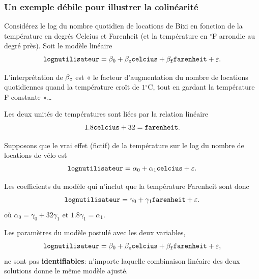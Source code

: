 \documentclass[xcolor={dvipsnames}]{beamer}
\begin{document}
\begin{frame}
\frametitle{Un exemple débile pour illustrer la colinéarité}
\bi
\item Considérez le log du nombre quotidien de locations de Bixi  en fonction de la température en degrés Celcius et Farenheit (et la température en ${}^{\circ}$F arrondie au degré près). Soit le modèle linéaire 
\begin{align*}
 \texttt{lognutilisateur} = \beta_0 + \beta_{\texttt{c}} \texttt{celcius} + \beta_{\texttt{f}} \texttt{farenheit} + \varepsilon.
\end{align*}
\item L'interprétation de $\beta_{\texttt{c}}$ est « le facteur d'augmentation du nombre de locations quotidiennes quand la température croît de $1{}^{\circ}$C, tout en gardant la température F constante »\ldots
\item Les deux unités de températures sont liées par la relation linéaire
\[1.8 \texttt{celcius} + 32= \texttt{farenheit}.\]
\ei
\end{frame}
\begin{frame}
\bi \item 
 Supposons que le vrai effet  (fictif) de la température sur le log du nombre de locations de vélo est
 \begin{align*}
  \texttt{lognutilisateur} = \alpha_0+ \alpha_1 \texttt{celcius} + \varepsilon.
 \end{align*}
\item Les coefficients du modèle qui n'inclut que la température Farenheit sont donc
 \begin{align*}
  \texttt{lognutilisateur} = \gamma_0 + \gamma_1\texttt{farenheit} + \varepsilon.
 \end{align*}
 où $\alpha_0 = \gamma_0 + 32\gamma_1$  et $1.8\gamma_1 = \alpha_1$.
 \item Les paramètres du modèle postulé avec les deux variables, 
 \begin{align*}
 \texttt{lognutilisateur} = \beta_0 + \beta_{\texttt{c}} \texttt{celcius} + \beta_{\texttt{f}} \texttt{farenheit} + \varepsilon,
\end{align*}
 ne sont pas \textbf{identifiables}: n'importe laquelle combinaison linéaire des deux solutions
 donne le même modèle ajusté.
\ei
\end{frame}
\end{document}
